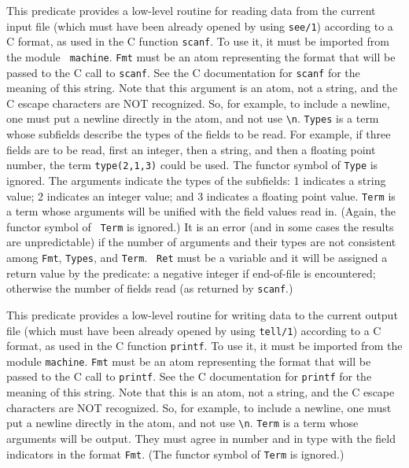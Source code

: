 \begin{description}

    This predicate provides a low-level routine for reading data from
    the current input file (which must have been already opened by using
    {\tt see/1}) according to a C format, as used in the C function
    {\tt scanf}. To use it, it must be imported from the module {\tt
    machine}.  {\tt Fmt} must be an atom representing the format that
    will be passed to the C call to {\tt scanf}.  See the C
    documentation for {\tt scanf} for the meaning of this string.
    Note that this argument is an atom, not a string, and the C escape
    characters are NOT recognized.  So, for example, to include a
    newline, one must put a newline directly in the atom, and not use
    \verb|\n|.  {\tt Types} is a term whose subfields describe the
    types of the fields to be read.  For example, if three fields are
    to be read, first an integer, then a string, and then a floating
    point number, the term {\tt type(2,1,3)} could be used. The
    functor symbol of {\tt Type} is ignored. The arguments indicate
    the types of the subfields: 1 indicates a string value; 2
    indicates an integer value; and 3 indicates a floating point
    value.  {\tt Term} is a term whose arguments will be unified with
    the field values read in.  (Again, the functor symbol of {\tt
    Term} is ignored.)  It is an error (and in some cases the results
    are unpredictable) if the number of arguments and their types are
    not consistent among {\tt Fmt}, {\tt Types}, and {\tt Term}.  {\tt
    Ret} must be a variable and it will be assigned a return value by
    the predicate: a negative integer if end-of-file is encountered;
    otherwise the number of fields read (as returned by {\tt scanf}.)

    This predicate provides a low-level routine for writing data to
    the current output file (which must have been already opened by using
    {\tt tell/1}) according to a C format, as used in the C function
    {\tt printf}.
    To use it, it must be imported from the module {\tt machine}.
    {\tt Fmt} must be an atom representing the format that will be
    passed to the C call to {\tt printf}.  See the C documentation
    for {\tt printf} for the meaning of this string.  Note that this
    is an atom, not a string, and the C escape characters are NOT
    recognized.  So, for example, to include a newline, one must put
    a newline directly in the atom, and not use \verb|\n|.
    {\tt Term} is a term whose arguments will be output. They must
    agree in number and in type with the field indicators in the
    format {\tt Fmt}.  (The functor symbol of {\tt Term} is ignored.)


\end{description}
